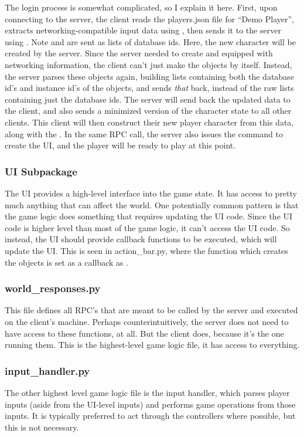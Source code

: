 \documentclass{article}
\begin{document}
The login process is somewhat complicated, so I explain it here. First, upon connecting to the
server, the client reads the players.json file for ``Demo Player'', extracts networking-compatible
input data using , then sends it to the server using
. Note  and  are sent as
lists of database ids. Here, the new character will be created by the server.
Since the server needed to create  and  equipped with networking
information, the client can't just make the objects by itself. Instead, the server parses
these objects again, building lists containing both the database id's and instance id's of the
objects, and sends {\it that} back, instead of the raw lists containing just the database ids.
The server will send back the updated data to the client, and also sends a minimized version of the
character state to all other clients. This client will then construct their new player character
from this data, along with the . In the same RPC call, the server also
issues the command to create the UI, and the player will be ready to play at this point.
\subsubsection{UI Subpackage}
The UI provides a high-level interface into the game state. It has access to pretty much anything that
can affect the world. One potentially common pattern is that the game logic does something that
requires updating the UI code. Since the UI code is higher level than most of the game logic, it can't
access the UI code. So instead, the UI should provide callback functions to be executed, which will
update the UI. This is seen in action\_bar.py, where the function which creates the 
objects is set as a callback as .
\subsubsection{world\_responses.py}
This file defines all RPC's that are meant to be called by the server and executed on the client's
machine. Perhaps counterintuitively, the server does not need to have access to these functions,
at all. But the client does, because it's the one running them. This is the highest-level game logic
file, it has access to everything.
\subsubsection{input\_handler.py}
The other highest level game logic file is the input handler, which parses player inputs (aside from
the UI-level inputs) and performs game operations from those inputs. It is typically preferred
to act through the controllers where possible, but this is not necessary.
\end{document}
